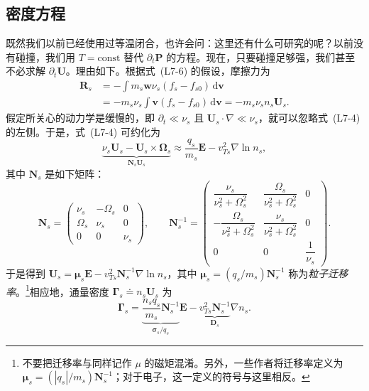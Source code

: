 \subsection{密度方程}
既然我们以前已经使用过等温闭合，也许会问：这里还有什么可研究的呢？以前没有碰撞，我们用 $T=\mathrm{const}$ 替代 $\partial_t\boldsymbol P$ 的方程。现在，只要碰撞足够强，我们甚至不必求解 $\partial_t\boldsymbol U$。理由如下。根据式~(L7-6) 的假设，摩擦力为
\begin{equation}
\begin{aligned}
\boldsymbol R_s
&=-\int m_s\boldsymbol w\nu_s(f_s-f_{s0})\,\mathrm d\boldsymbol v\\
&=-m_s\nu_s\int\boldsymbol v(f_s-f_{s0})\,\mathrm d\boldsymbol v
=-m_s\nu_sn_s\boldsymbol U_s.
\end{aligned}
\tag{L7-7}\label{eq:L7:7}
\end{equation}
假定所关心的动力学是缓慢的，即 $\partial_t\ll\nu_s$ 且 $\boldsymbol U_s\cdot\nabla\ll\nu_s$，就可以忽略式~(L7-4) 的左侧。于是，式~(L7-4) 可约化为
\begin{equation}
\underbrace{\nu_s\boldsymbol U_s-\boldsymbol U_s\times\boldsymbol\Omega_s}_{\boldsymbol N_s\boldsymbol U_s}
\approx\frac{q_s}{m_s}\boldsymbol E-v_{Ts}^{2}\nabla\ln n_s,
\tag{L7-8}\label{eq:L7:8}
\end{equation}
其中 $\boldsymbol N_s$ 是如下矩阵：
\begin{equation}
\boldsymbol N_s=
\begin{pmatrix}
\nu_s&-\Omega_s&0\\
\Omega_s&\nu_s&0\\
0&0&\nu_s
\end{pmatrix},\qquad
\boldsymbol N_s^{-1}=
\begin{pmatrix}
\dfrac{\nu_s}{\nu_s^2+\Omega_s^2}&\dfrac{\Omega_s}{\nu_s^2+\Omega_s^2}&0\\[4pt]
-\dfrac{\Omega_s}{\nu_s^2+\Omega_s^2}&\dfrac{\nu_s}{\nu_s^2+\Omega_s^2}&0\\[4pt]
0&0&\dfrac1{\nu_s}
\end{pmatrix}.
\tag{L7-9}\label{eq:L7:9}
\end{equation}
于是得到 $\boldsymbol U_s=\boldsymbol\mu_s\boldsymbol E-v_{Ts}^{2}\boldsymbol N_s^{-1}\nabla\ln n_s$，其中 $\boldsymbol\mu_s=(q_s/m_s)\boldsymbol N_s^{-1}$ 称为\emph{粒子迁移率}。\footnote{不要把迁移率与同样记作 $\mu$ 的磁矩混淆。另外，一些作者将迁移率定义为 $\boldsymbol\mu_s=(|q_s|/m_s)\boldsymbol N_s^{-1}$；对于电子，这一定义的符号与这里相反。}相应地，通量密度 $\boldsymbol\Gamma_s\doteq n_s\boldsymbol U_s$ 为
\begin{equation}
\boldsymbol\Gamma_s=
\underbrace{\frac{n_sq_s}{m_s}\boldsymbol N_s^{-1}}_{\boldsymbol\sigma_s/q_s}\boldsymbol E
-\underbrace{v_{Ts}^{2}\boldsymbol N_s^{-1}}_{\boldsymbol D_s}\nabla n_s.
\tag{L7-10}\label{eq:L7:10}
\end{equation}
